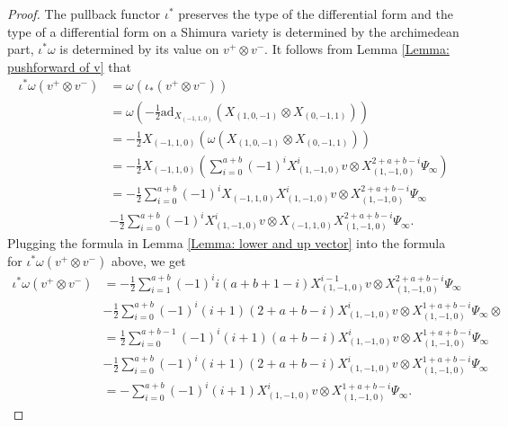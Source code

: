 \documentclass[11pt, a4paper]{amsart}
\theoremstyle{plain}
\theoremstyle{definition}
\numberwithin{equation}{section}
\begin{document}
\begin{proof}
    The pullback functor $\iota^{*}$ preserves the type of the differential form and the type of a differential form on a Shimura variety is determined by the archimedean part, $\iota^{*}\omega$ is determined by its value on $v^{+} \otimes v^{-}$. 
    It follows from Lemma \ref{Lemma: pushforward of v} that
    \begin{align*}
        \iota^{*}\omega(v^{+} \otimes v^{-}) &= \omega(\iota_{*}(v^{+} \otimes v^{-})) \\
                                             &= \omega(-\frac{1}{2}\mathrm{ad}_{X_{(-1, 1, 0)}}(X_{(1, 0, -1)} \otimes X_{(0, -1, 1)})) \\
                                             & = -\frac{1}{2} X_{(-1, 1, 0)} (\omega(X_{(1, 0, -1)} \otimes X_{(0, -1, 1)})) \\
                                             & = -\frac{1}{2} X_{(-1, 1, 0)}(\sum\limits_{i = 0}^{a + b} (-1)^{i} X_{(1, -1 ,0)}^{i} v \otimes X^{2 + a + b - i}_{(1, -1, 0)} \Psi_{\infty}) \\
                                             & = -\frac{1}{2} \sum\limits_{i = 0}^{a + b} (-1)^{i} X_{(-1, 1, 0)} X_{(1, -1 ,0)}^{i} v \otimes X^{2 + a + b - i}_{(1, -1, 0)} \Psi_{\infty} \\
                                             & -\frac{1}{2} \sum\limits_{i = 0}^{a + b} (-1)^{i} X_{(1, -1 ,0)}^{i} v \otimes X_{(-1, 1, 0)}X^{2 + a + b - i}_{(1, -1, 0)} \Psi_{\infty}. 
    \end{align*} 
    Plugging the formula in Lemma \ref{Lemma: lower and up vector} into the formula for $\iota^{*}\omega(v^{+} \otimes v^{-})$ above, we get 
    \begin{align*}
        \iota^{*}\omega(v^{+} \otimes v^{-}) & = -\frac{1}{2} \sum\limits_{i = 1}^{a + b} (-1)^{i}i(a + b + 1 - i) X_{(1, -1 ,0)}^{i - 1} v \otimes X^{2 + a + b - i}_{(1, -1, 0)} \Psi_{\infty} \\
                                             & -\frac{1}{2} \sum\limits_{i = 0}^{a + b} (-1)^{i} (i + 1)(2 + a + b - i) X_{(1, -1 ,0)}^{i} v \otimes X^{1 + a + b - i}_{(1, -1, 0)} \Psi_{\infty} \otimes \\
                                             & = \frac{1}{2} \sum\limits_{i = 0}^{a + b - 1} (-1)^{i}(i + 1)(a + b - i) X_{(1, -1 ,0)}^{i} v \otimes X^{1 + a + b - i}_{(1, -1, 0)} \Psi_{\infty} \\
                                             & -\frac{1}{2} \sum\limits_{i = 0}^{a + b} (-1)^{i} (i + 1)(2 + a + b - i) X_{(1, -1 ,0)}^{i} v \otimes X^{1 + a + b - i}_{(1, -1, 0)} \Psi_{\infty} \\
                                             & = - \sum\limits_{i = 0}^{a + b} (-1)^{i}(i + 1) X_{(1, -1 ,0)}^{i} v \otimes X^{1 + a + b - i}_{(1, -1, 0)} \Psi_{\infty}. 
    \end{align*}
\end{proof}
\end{document}
